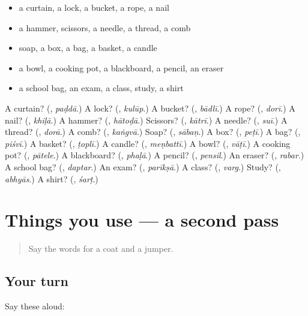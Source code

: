 \begin{itemize}
\raggedright
  \item a curtain, a lock, a bucket, a rope, a nail
  \item a hammer, scissors, a needle, a thread, a comb
  \item soap, a box, a bag, a basket, a candle
  \item a bowl, a cooking pot, a blackboard, a pencil, an eraser
  \item a school bag, an exam, a class, study, a shirt
\end{itemize}

\begin{tcolorbox}[breakable,colback=teal!4,colframe=teal!35!black,title={Before you move on}]
A curtain? (\textbf{}, \emph{paḍdā}.) A lock? (\textbf{}, \emph{kulūp}.) A bucket? (\textbf{}, \emph{bādlī}.) A rope? (\textbf{}, \emph{dorī}.) A nail? (\textbf{}, \emph{khiḷā}.) A hammer? (\textbf{}, \emph{hātoḍā}.) Scissors? (\textbf{}, \emph{kātrī}.) A needle? (\textbf{}, \emph{suī}.) A thread? (\textbf{}, \emph{dorā}.) A comb? (\textbf{}, \emph{kaṅgvā}.) Soap? (\textbf{}, \emph{sābaṇ}.) A box? (\textbf{}, \emph{peṭī}.) A bag? (\textbf{}, \emph{piśvī}.) A basket? (\textbf{}, \emph{ṭoplī}.) A candle? (\textbf{}, \emph{meṇbattī}.) A bowl? (\textbf{}, \emph{vāṭī}.) A cooking pot? (\textbf{}, \emph{pātele}.) A blackboard? (\textbf{}, \emph{phaḷā}.) A pencil? (\textbf{}, \emph{pensil}.) An eraser? (\textbf{}, \emph{rabar}.) A school bag? (\textbf{}, \emph{daptar}.) An exam? (\textbf{}, \emph{parīkṣā}.) A class? (\textbf{}, \emph{varg}.) Study? (\textbf{}, \emph{abhyās}.) A shirt? (\textbf{}, \emph{śarṭ}.)
\end{tcolorbox}
\section[(dialogue)]{Things you use — a second pass}

\label{lesson:MR-R140-second-pass-things-you-use}



\begin{quote}
Say the words for a coat and a jumper.
\end{quote}

\subsection*{Your turn}
Say these aloud:

